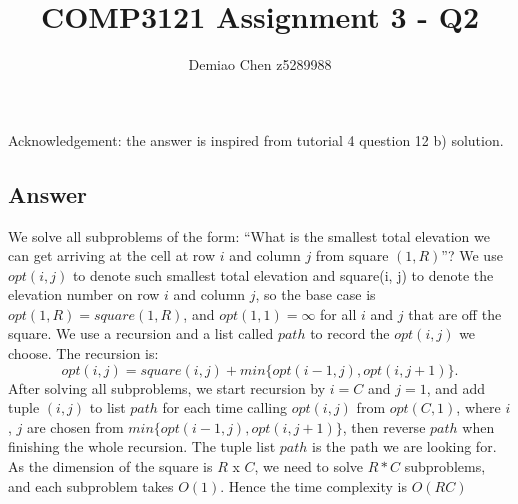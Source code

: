\documentclass[12pt]{article}
\title{COMP3121 Assignment 3 - Q2}
\author{Demiao Chen z5289988}
\begin{document}
\maketitle
{}
Acknowledgement: the answer is inspired from tutorial 4 question 12 b) solution.

\subsection*{Answer}
We solve all subproblems of the form: 
``What is the smallest total elevation we can get arriving 
at the cell at row $i$ and column $j$ from square $(1, R)$”?
We use $opt(i,j)$ to denote such smallest total elevation and 
square(i, j) to denote the elevation number on row $i$ and column $j$, so 
the base case is $opt(1,R) = square(1, R)$, and $opt(1,1) = \infty$ for
 all $i $ and $j$ that are off the square. We use a recursion and a list 
 called $path$ to record the $opt(i, j)$ we choose.
 The recursion is: 
\[
 opt(i, j) = square(i, j) + min\{opt(i - 1, j), opt(i, j + 1)\} .
\]
After solving all subproblems, we start recursion by $i = C$ and $j = 1$, and 
add tuple $(i, j)$ to list $path$
for each time calling $opt(i,j)$ from $opt(C,1)$, where $i$, $j$ are chosen from $min\{opt(i - 1, j), opt(i, j + 1)\}$,
then reverse $path$
when finishing the whole recursion. The tuple list $path$ is the path we are looking for.\\
As the dimension of the square is $R$ x $C$, we need to solve $R * C$ subproblems,
and each subproblem takes $O(1)$. Hence the time complexity is $O(RC)$
\end{document}
